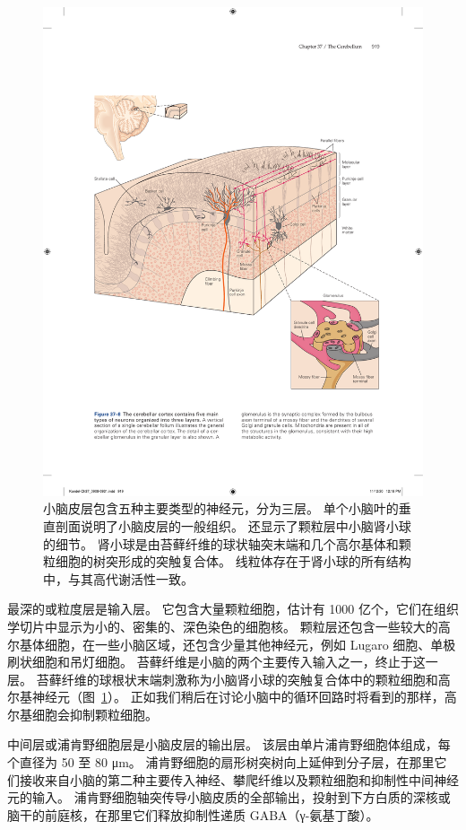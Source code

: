 \begin{figure}[htbp]
	\centering
	\includegraphics[width=0.9\linewidth]{chap37/fig_37_8}
	\caption{小脑皮层包含五种主要类型的神经元，分为三层。 单个小脑叶的垂直剖面说明了小脑皮层的一般组织。 还显示了颗粒层中小脑肾小球的细节。 肾小球是由苔藓纤维的球状轴突末端和几个高尔基体和颗粒细胞的树突形成的突触复合体。 线粒体存在于肾小球的所有结构中，与其高代谢活性一致。}
	\label{fig:37_8}
\end{figure}


最深的或粒度层是输入层。
它包含大量颗粒细胞，估计有 1000 亿个，它们在组织学切片中显示为小的、密集的、深色染色的细胞核。
颗粒层还包含一些较大的高尔基体细胞，在一些小脑区域，还包含少量其他神经元，例如 Lugaro 细胞、单极刷状细胞和吊灯细胞。
苔藓纤维是小脑的两个主要传入输入之一，终止于这一层。
苔藓纤维的球根状末端刺激称为小脑肾小球的突触复合体中的颗粒细胞和高尔基神经元（图~\ref{fig:37_8}）。
正如我们稍后在讨论小脑中的循环回路时将看到的那样，高尔基细胞会抑制颗粒细胞。


中间层或浦肯野细胞层是小脑皮层的输出层。
该层由单片浦肯野细胞体组成，每个直径为 50 至 80 μm。
浦肯野细胞的扇形树突树向上延伸到分子层，在那里它们接收来自小脑的第二种主要传入神经、攀爬纤维以及颗粒细胞和抑制性中间神经元的输入。
浦肯野细胞轴突传导小脑皮质的全部输出，投射到下方白质的深核或脑干的前庭核，在那里它们释放抑制性递质 GABA（γ-氨基丁酸）。


